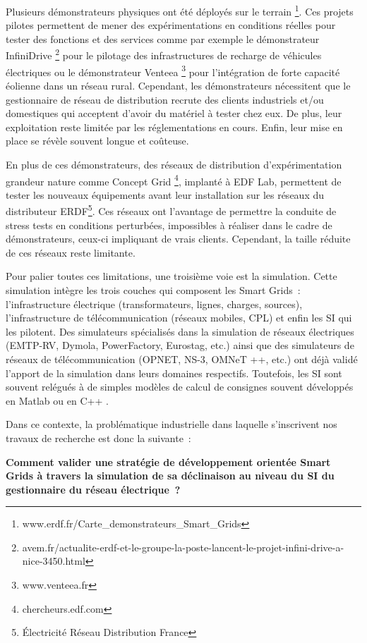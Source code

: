 Plusieurs démonstrateurs physiques ont été déployés sur le terrain 
\footnote{www.erdf.fr/Carte\_demonstrateurs\_Smart\_Grids}. Ces projets pilotes 
permettent de mener des expérimentations en conditions réelles pour tester des 
fonctions et des services comme par exemple le démonstrateur InfiniDrive 
\footnote{avem.fr/actualite-erdf-et-le-groupe-la-poste-lancent-le-projet-infini-drive-a-nice-3450.html} 
pour le pilotage des infrastructures de recharge de véhicules électriques ou le 
démonstrateur Venteea \footnote{www.venteea.fr} pour l'intégration de forte 
capacité éolienne dans un réseau rural. Cependant, les démonstrateurs 
nécessitent que le gestionnaire de réseau de distribution recrute des clients 
industriels et/ou domestiques qui acceptent d'avoir du matériel à tester chez 
eux. De plus, leur exploitation reste limitée par les réglementations en cours. 
Enfin, leur mise en place se révèle souvent longue et coûteuse. 

En plus de ces démonstrateurs, des réseaux de distribution d'expérimentation 
grandeur nature comme Concept Grid \footnote{chercheurs.edf.com}, implanté à EDF 
Lab, permettent de tester les nouveaux équipements avant leur installation sur 
les réseaux du distributeur ERDF\footnote{Électricité Réseau Distribution 
France}. Ces réseaux ont l'avantage de permettre la conduite de stress tests en 
conditions perturbées, impossibles à réaliser dans le cadre de démonstrateurs, 
ceux-ci impliquant de vrais clients. Cependant, la taille réduite de ces réseaux 
reste limitante.

Pour palier toutes ces limitations, une troisième voie est la simulation. Cette 
simulation intègre les trois couches qui composent les Smart Grids~: 
l'infrastructure électrique (transformateurs, lignes, charges, sources), 
l'infrastructure de télécommunication (réseaux mobiles, CPL) et enfin les SI qui 
les pilotent. Des simulateurs spécialisés dans la simulation de réseaux 
électriques (EMTP-RV, Dymola, PowerFactory, Eurostag, etc.) ainsi que des 
simulateurs de réseaux de télécommunication (OPNET, NS-3, OMNeT ++, etc.) ont 
déjà validé l'apport de la simulation dans leurs domaines respectifs. Toutefois, 
les SI sont souvent relégués à de simples modèles de calcul de consignes souvent 
développés en Matlab ou en C++ \cite{palensky2014simulating}. 

Dans ce contexte, la problématique industrielle dans laquelle  s'inscrivent nos 
travaux de recherche est donc la suivante~: 

\textbf{Comment valider une stratégie de développement orientée Smart Grids à 
travers la simulation de sa déclinaison au niveau du SI du gestionnaire du 
réseau électrique~?}


